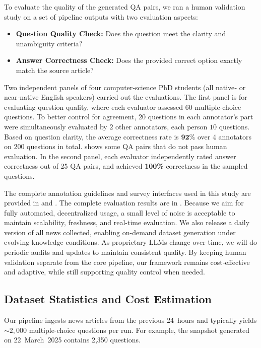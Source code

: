\documentclass[11pt]{article}
\begin{document}
To evaluate the quality of the generated QA pairs, we ran a 
human validation study on a set of pipeline outputs with two evaluation aspects:
\begin{itemize}[leftmargin=*]
    \item \textbf{Question Quality Check:} Does the question meet the clarity and unambiguity criteria?
    \item \textbf{Answer Correctness Check:} Does the provided correct option exactly match the source article?
\end{itemize}
\noindent
Two independent panels of four computer‑science PhD students (all native‑ or near‑native English speakers) carried out the evaluations. 
The first panel is for evaluating question quality, where each evaluator assessed $60$ multiple-choice questions.
To better control for agreement, $20$ questions in each annotator's part were simultaneously evaluated by $2$ other annotators, each person $10$ questions.
Based on question clarity, the average correctness rate is $\mathbf{92\%}$ over $4$ annotators on $200$ questions in total.  shows some QA pairs that do not pass human evaluation.
In the second panel, each evaluator independently rated answer correctness out of 25 QA pairs, and achieved \textbf{100\%} correctness in the sampled questions.


The complete annotation
guidelines and survey interfaces used in this study are provided in  and . The complete evaluation results are in .
Because we aim for fully automated, decentralized usage, a small level of noise is acceptable to maintain scalability, freshness, and real-time evaluation.  We also release a daily version of all news collected, enabling on-demand dataset generation under evolving knowledge conditions.  As proprietary LLMs change over time, we will do periodic audits and updates to maintain consistent quality.  By keeping human validation separate from the core pipeline, our framework remains cost‐effective and adaptive, while still supporting quality control when needed.


\subsection{Dataset Statistics and Cost Estimation}
\label{sec:dataset-stats}

Our pipeline ingests news articles from the previous 24~hours and typically yields \(\sim\!\!2{,}000\) multiple-choice questions per run.  
For example, the snapshot generated on 22~March~2025 contains 2{,}350 questions.
\end{document}
